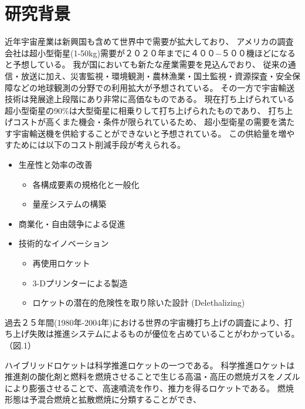 \section{研究背景}
%
%
近年宇宙産業は新興国も含めて世界中で需要が拡大しており、
アメリカの調査会社は超小型衛星(1-50kg)需要が２０２０年までに４００−５００機ほどになると予想している。\cite{nano/micro}
我が国においても新たな産業需要を見込んでおり、
従来の通信・放送に加え、災害監視・環境観測・農林漁業・国土監視・資源探査・安全保障などの地球観測の分野での利用拡大が予想されている。
その一方で宇宙輸送技術は発展途上段階にあり非常に高価なものである。
現在打ち上げられている超小型衛星の90\%は大型衛星に相乗りして打ち上げられたものであり、
打ち上げコストが高くまた機会・条件が限られているため、
超小型衛星の需要を満たす宇宙輸送機を供給することができないと予想されている。
この供給量を増やすためには以下のコスト削減手段が考えられる。
\begin{itemize}
	\item 生産性と効率の改善
	\begin{itemize}
		\item 各構成要素の規格化と一般化
		\item 量産システムの構築
	\end{itemize}
	\item 商業化・自由競争による促進
	\item 技術的なイノベーション
	\begin{itemize}
		\item 再使用ロケット
		\item 3-Dプリンターによる製造
		\item ロケットの潜在的危険性を取り除いた設計 (Delethalizing)
	\end{itemize}
\end{itemize}
過去２５年間(1980年-2004年)における世界の宇宙機打ち上げの調査により、打ち上げ失敗は推進システムによるものが優位を占めていることがわかっている。（図.1）\cite{failure}

ハイブリッドロケットは科学推進ロケットの一つである。
科学推進ロケットは推進剤の酸化剤と燃料を燃焼させることで生じる高温・高圧の燃焼ガスをノズルにより膨張させることで、高速噴流を作り、推力を得るロケットである。
燃焼形態は予混合燃焼と拡散燃焼に分類することができ、
